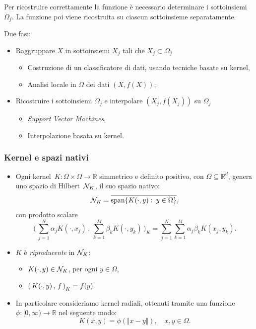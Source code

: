\documentclass[10pt]{beamer}
\theoremstyle{definition}
\theoremstyle{plain}
\def\R{\mathbb R}
\def\Cal#1{{\cal #1}}
\def\form#1#2{(\,#1\,,\,#2\,)}
\def\Bform#1#2{\biggl(\,#1\,,\,#2\,\biggr)}
\def\norm#1{\Vert #1\Vert}
\def\hbyw#1#2{\vbox to #1{\vfil \hbox to #2{\hfil}}}
\def\lK{{\lower.5ex\hbox{$\scriptstyle K$}}}
\begin{document}
\begin{frame}
Per ricostruire correttamente la funzione è necessario determinare i sottoinsiemi~$\Omega_j$.
La funzione poi viene ricostruita su ciascun sottoinsieme separatamente.

\medskip
Due fasi:
\begin{itemize}
\item Raggruppare  $X$ in sottoinsiemi $X_j$ tali che $X_j\subset \Omega_j$
	\begin{itemize}
	\item Costruzione di un \alert{classificatore} di dati, usando tecniche basate su kernel,
	\item Analisi locale in $\Omega$ dei dati $(X,f(X))$;
	\end{itemize}
\item Ricostruire i sottoinsiemi $\Omega_j$ e interpolare $(X_j, f(X_j))$ su $\Omega_j$
	\begin{itemize}
	\item {\em Support Vector Machines},
	\item Interpolazione basata su kernel.
	\end{itemize}
\end{itemize}
\end{frame}



\begin{frame}
\frametitle{Kernel e spazi nativi}
\begin{itemize}
\item
Ogni \alert{kernel}~$K:\Omega\times\Omega\to\R$ simmetrico e definito positivo, con $\Omega\subseteq\R^d$, genera uno spazio di Hilbert~$\Cal N_K$, il suo \alert{spazio nativo}:
$$
\Cal N_K = \overline{\operatorname{span}\{K(\cdot, y):\> y\in\Omega\}\hbyw{2ex}{0em}},
$$
con prodotto scalare
$$
\Bform{\sum_{j=1}^N\alpha_jK(\cdot, x_j)}{\sum_{k=1}^M\beta_k K(\cdot,y_k)}_{\!\!K} =  \sum_{j=1}^N\sum_{k=1}^M \alpha_j \beta_k K(x_j,y_k).
$$


\item
$K$ è \emph{riproducente} in $\Cal N_K$:
\begin{itemize}
\item $K(\cdot, y) \in\Cal N_K$, \quad per ogni $y\in\Omega$,
\item  $\form{K(\cdot, y)}f_{\lK} = f(y)$.
\end{itemize}

\medskip\item
In particolare consideriamo kernel \alert{radiali}, ottenuti tramite una funzione  $\phi:[0,\infty)\to\R$ nel seguente modo:
$$
K(x, y) = \phi(\norm{x - y}), \quad x,y\in\Omega.
$$
\end{itemize}
\end{frame}
\end{document}
